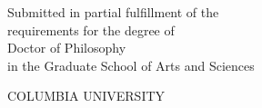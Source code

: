 \thispagestyle{empty} %
\begin{center}
  \SingleSpace

  \vspace*{1in}

  \@title

  \bigskip %

  \@author

  \vspace{5in}

  Submitted in partial fulfillment of the\\
  requirements for the degree of\\
  Doctor of Philosophy\\
  in the Graduate School of Arts and Sciences

  \bigskip
  \bigskip

  COLUMBIA UNIVERSITY

  \bigskip %

  \@date
\end{center}
